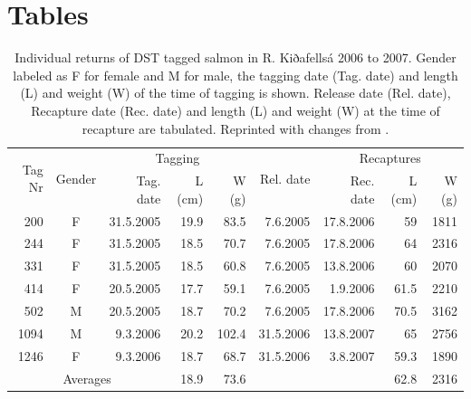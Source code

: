    

\clearpage
\section*{Tables}

\begin{table}[ht]
  \centering
  \caption{Individual returns of DST tagged salmon in R. Kiðafellsá 2006 to 2007. 
    Gender labeled as F for female and M for male, 
    the tagging date (Tag. date) and length (L) and weight (W) of the time of tagging is shown.
    Release date (Rel. date), Recapture date (Rec. date) and length (L) and weight (W) at the time of recapture are tabulated. Reprinted with changes from \citet{Gudjonsson2015}.}
  \begin{tabular}{rcrrrrrrr}
    \hline
     \multirow{2}{*}{Tag Nr} & \multirow{2}{*}{Gender} &   \multicolumn{3}{c}{Tagging} & \multirow{2}{*}{Rel. date} &\multicolumn{3}{c}{Recaptures}\\
     \cline{3-5} \cline{7-9}
     && Tag. date & L (cm) & W (g) && Rec. date & L (cm)&W (g)  \\
    \hline
     200 & F & 31.5.2005 & 19.9 & 83.5&  7.6.2005 & 17.8.2006 &59  & 1811 \\
     244 & F & 31.5.2005 & 18.5 & 70.7&  7.6.2005 & 17.8.2006 &64  & 2316 \\
     331 & F & 31.5.2005 & 18.5 & 60.8&  7.6.2005 & 13.8.2006 &60 & 2070 \\
     414 & F & 20.5.2005 & 17.7 & 59.1&  7.6.2005 &  1.9.2006 &61.5& 2210 \\
     502 & M & 20.5.2005 & 18.7 & 70.2&  7.6.2005 & 17.8.2006 &70.5& 3162 \\
    1094 & M &  9.3.2006 & 20.2 &102.4& 31.5.2006 & 13.8.2007 &65  & 2756 \\
    1246 & F &  9.3.2006 & 18.7 & 68.7& 31.5.2006 & 3.8.2007 &59.3& 1890 \\
    \hline
    \multicolumn{3}{c}{Averages}&18.9&73.6&&&62.8&2316\\
    \hline
  \end{tabular}
  \label{tab:WandL}
\end{table}


